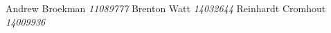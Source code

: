 \begin{flushright}
	Andrew Broekman		\emph{11089777}		\newline
	Brenton Watt 		\emph{14032644} 	\newline
	Reinhardt Cromhout 		\emph{14009936} 	\newline
\end{flushright}
